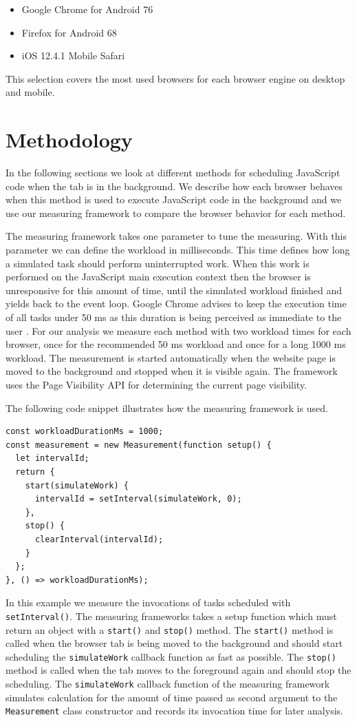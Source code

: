 \documentclass[
	ruledheaders=section,%
	class=report,%
	thesis={type=bachelor},%
	accentcolor=9c,%
	custommargins=true,%
	marginpar=false,%
	parskip=half-,%
	fontsize=11pt,%
]{tudapub}
\begin{document}
  \begin{itemize}
  \item Google Chrome for Android 76
  \item Firefox for Android 68
  \item iOS 12.4.1 Mobile Safari
  \end{itemize}

  This selection covers the most used browsers for each browser engine on desktop and mobile.

  \section{Methodology}

  In the following sections we look at different methods for scheduling JavaScript code when the tab is in the background. We describe how each browser behaves when this method is used to execute JavaScript code in the background and we use our measuring framework to compare the browser behavior for each method.

  The measuring framework takes one parameter to tune the measuring. With this parameter we can define the workload in milliseconds. This time defines how long a simulated task should perform uninterrupted work. When this work is performed on the JavaScript main execution context then the browser is unresponsive for this amount of time, until the simulated workload finished and yields back to the event loop. Google Chrome advises to keep the execution time of all tasks under 50 ms as this duration is being perceived as immediate to the user \cite{chrome-rail-model}. For our analysis we measure each method with two workload times for each browser, once for the recommended 50 ms workload and once for a long 1000 ms workload. The measurement is started automatically when the website page is moved to the background and stopped when it is visible again. The framework uses the Page Visibility API \cite{mdn-page-visibility} for determining the current page visibility.

  The following code snippet illustrates how the measuring framework is used.
\begin{lstlisting}
const workloadDurationMs = 1000;
const measurement = new Measurement(function setup() {
  let intervalId;
  return {
    start(simulateWork) {
      intervalId = setInterval(simulateWork, 0);
    },
    stop() {
      clearInterval(intervalId);
    }
  };
}, () => workloadDurationMs);
\end{lstlisting}
  In this example we measure the invocations of tasks scheduled with \texttt{setInterval()}. The measuring frameworks takes a setup function which must return an object with a \texttt{start()} and \texttt{stop()} method. The \texttt{start()} method is called when the browser tab is being moved to the background and should start scheduling the \texttt{simulateWork} callback function as fast as possible. The \texttt{stop()} method is called when the tab moves to the foreground again and should stop the scheduling. The \texttt{simulateWork} callback function of the measuring framework simulates calculation for the amount of time passed as second argument to the \texttt{Measurement} class constructor and records its invocation time for later analysis.
\end{document}
